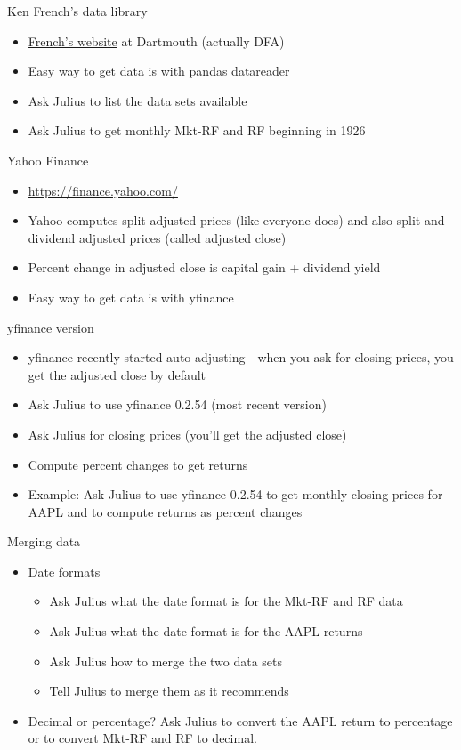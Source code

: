 \documentclass[10pt]{beamer}
\begin{document}
\begin{frame}{Ken French's data library}
\begin{itemize}
\item \href{https://mba.tuck.dartmouth.edu/pages/faculty/ken.french/data_library.html}{French's website} at Dartmouth (actually DFA)
\item Easy way to get data is with pandas datareader
\item Ask Julius to list the data sets available
\item Ask Julius to get monthly Mkt-RF and RF beginning in 1926
\end{itemize}
\end{frame}

\begin{frame}{Yahoo Finance}
\begin{itemize}
\item \href{https://finance.yahoo.com/}{https://finance.yahoo.com/}
\item Yahoo computes split-adjusted prices (like everyone does) and also split and dividend adjusted prices (called adjusted close)
\item Percent change in adjusted close is capital gain + dividend yield
\item Easy way to get data is with yfinance
\end{itemize}
\end{frame}

\begin{frame}{yfinance version}
\begin{itemize}
\item yfinance recently started auto adjusting - when you ask for closing prices, you get the adjusted close by default
\item Ask Julius to use yfinance 0.2.54 (most recent version)
\item Ask Julius for closing prices (you'll get the adjusted close)
\item Compute percent changes to get returns
\item Example: Ask Julius to use yfinance 0.2.54 to get monthly closing prices for AAPL and to compute returns as percent changes
\end{itemize}
\end{frame}

\begin{frame}{Merging data}
\begin{itemize} 
\item Date formats
\begin{itemize}
\item Ask Julius what the date format is for the Mkt-RF and RF data
\item Ask Julius what the date format is for the AAPL returns
\item Ask Julius how to merge the two data sets
\item Tell Julius to merge them as it recommends
\end{itemize}
\item Decimal or percentage?  Ask Julius to convert the AAPL return to percentage or to convert Mkt-RF and RF to decimal.
\end{itemize}
\end{frame}
\end{document}
